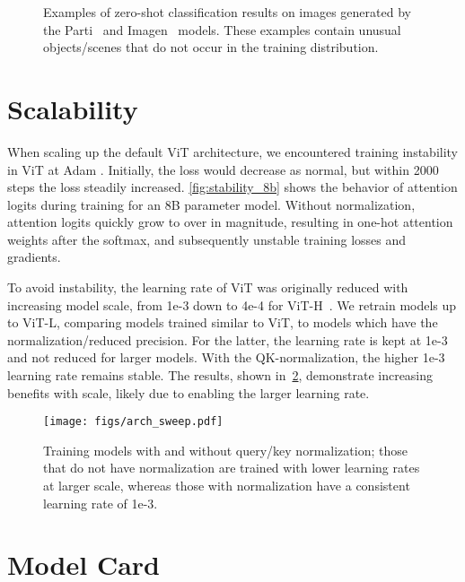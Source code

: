 \documentclass{article}
\begin{document}
\begin{figure}[hb]
\newlength{\figwidth}\setlength{\figwidth}{0.45\textwidth}
\centering
{} \caption{Examples of zero-shot classification results on images generated by the Parti~\citep{parti} and Imagen~\citep{imagen} models.
These examples contain unusual objects/scenes that do not occur in the training distribution.
\label{tab:lit_examples}
}
\end{figure}
\clearpage
\newpage \section{Scalability}
\label{app:scalability}
When scaling up the default ViT architecture, we encountered training instability in ViT at Adam . Initially, the loss would decrease as normal, but within 2000 steps the loss steadily increased. \cref{fig:stability_8b} shows the behavior of attention logits during training for an 8B parameter model. Without normalization, attention logits quickly grow to over  in magnitude, resulting in one-hot attention weights after the softmax, and subsequently unstable training losses and gradients.

To avoid instability, the learning rate of ViT was originally reduced with increasing model scale, from 1e-3 down to 4e-4 for ViT-H~\citep{dosovitskiy2020image}. We retrain models up to ViT-L, comparing models trained similar to ViT, to models which have the normalization/reduced precision. For the latter, the learning rate is kept at 1e-3 and not reduced for larger models. With the QK-normalization, the higher 1e-3 learning rate remains stable. The results, shown in~\cref{fig:arch_sweep}, demonstrate increasing benefits with scale, likely due to enabling the larger learning rate.

\begin{figure}[htb]
    \centering
    \texttt{[image: figs/arch\_sweep.pdf]}
\caption{Training models with and without query/key normalization; those that do not have normalization are trained with lower learning rates at larger scale, whereas those with normalization have a consistent learning rate of 1e-3.}
    \label{fig:arch_sweep}
\end{figure} \newpage  \section{Model Card}
\label{app:model_card}
\end{document}
